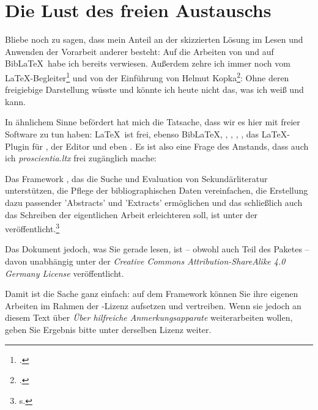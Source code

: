 \section{Die Lust des freien Austauschs}

Bliebe noch zu sagen, dass mein Anteil an der skizzierten Lösung im Lesen und Anwenden der Vorarbeit anderer besteht: Auf die Arbeiten von  und auf Bib\LaTeX\ habe ich bereits verwiesen. Außerdem zehre ich immer noch vom \LaTeX-Begleiter\footcite[vgl.][S. 741ff]{MitGoo2005a} und von der Einführung von Helmut Kopka\footcite[vgl.][]{Kopka2000a}: Ohne deren freigiebige Darstellung wüsste und könnte ich heute nicht das, was ich weiß und kann.

In ähnlichem Sinne befördert hat mich die Tatsache, dass wir es hier mit freier Software zu tun haben: \LaTeX\ ist frei, ebenso Bib\LaTeX, ,  , , , das \LaTeX-Plugin für , der Editor   und eben . Es ist also eine Frage des Anstands, dass auch ich \textit{proscientia.ltx} frei zugänglich mache:

Das Framework , das die Suche und Evaluation von Sekundärliteratur unterstützen, die Pflege der bibliographischen Daten vereinfachen, die Erstellung dazu passender ’Abstracts’ und ’Extracts’ ermöglichen und das schließlich auch das Schreiben der eigentlichen Arbeit erleichteren soll, ist unter der  veröffentlicht.\footnote{s. }

Das Dokument jedoch, was Sie gerade lesen, ist -- obwohl auch Teil des Paketes -- davon unabhängig unter der \textit{Creative Commons Attribution-ShareAlike 4.0 Germany License} veröffentlicht.

Damit ist die Sache ganz einfach: auf dem Framework  können Sie ihre eigenen Arbeiten im Rahmen der -Lizenz aufsetzen und vertreiben. Wenn sie jedoch an diesem Text über \textit{Über hilfreiche Anmerkungsapparate} weiterarbeiten wollen, geben Sie Ergebnis bitte unter derselben Lizenz weiter.
